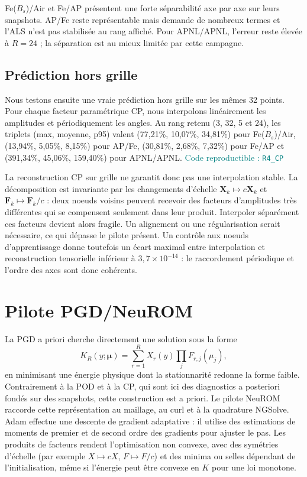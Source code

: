 \documentclass[10pt,a4paper]{article}
\newcommand{\codecell}[1]{\textcolor{teal}{\textsf{Code reproductible : \texttt{#1}}}}
\begin{document}
Fe($B_s$)/Air et Fe/AP présentent une forte séparabilité axe par axe sur leurs snapshots. AP/Fe reste représentable mais demande de nombreux termes et l'ALS n'est pas stabilisée au rang affiché. Pour APNL/APNL, l'erreur reste élevée à $R=24$ ; la séparation est au mieux limitée par cette campagne.

\subsection{Prédiction hors grille}
Nous testons ensuite une vraie prédiction hors grille sur les mêmes 32 points. Pour chaque facteur paramétrique CP, nous interpolons linéairement les amplitudes et périodiquement les angles. Au rang retenu (3, 32, 5 et 24), les triplets (max, moyenne, p95) valent (77,21\%, 10,07\%, 34,81\%) pour Fe($B_s$)/Air, (13,94\%, 5,05\%, 8,15\%) pour AP/Fe, (30,81\%, 2,68\%, 7,32\%) pour Fe/AP et (391,34\%, 45,06\%, 159,40\%) pour APNL/APNL. \codecell{R4\_CP}

La reconstruction CP sur grille ne garantit donc pas une interpolation stable. La décomposition est invariante par les changements d'échelle $\bm X_k\mapsto c\bm X_k$ et $\bm F_k\mapsto\bm F_k/c$ : deux noeuds voisins peuvent recevoir des facteurs d'amplitudes très différentes qui se compensent seulement dans leur produit. Interpoler séparément ces facteurs devient alors fragile. Un alignement ou une régularisation serait nécessaire, ce qui dépasse le pilote présent. Un contrôle aux noeuds d'apprentissage donne toutefois un écart maximal entre interpolation et reconstruction tensorielle inférieur à $3,7\times10^{-14}$ : le raccordement périodique et l'ordre des axes sont donc cohérents.

\section{Pilote PGD/NeuROM}
La PGD a priori \cite{chinesta} cherche directement une solution sous la forme
\[
K_R(y;\bm\mu)=\sum_{r=1}^R X_r(y)\prod_jF_{r,j}(\mu_j),
\]
en minimisant une énergie physique dont la stationnarité redonne la forme faible. Contrairement à la POD et à la CP, qui sont ici des diagnostics a posteriori fondés sur des snapshots, cette construction est a priori. Le pilote NeuROM \cite{daby} raccorde cette représentation au maillage, au curl et à la quadrature NGSolve. Adam \cite{adam} effectue une descente de gradient adaptative : il utilise des estimations de moments de premier et de second ordre des gradients pour ajuster le pas. Les produits de facteurs rendent l'optimisation non convexe, avec des symétries d'échelle (par exemple $X\mapsto cX$, $F\mapsto F/c$) et des minima ou selles dépendant de l'initialisation, même si l'énergie peut être convexe en $K$ pour une loi monotone.
\end{document}
